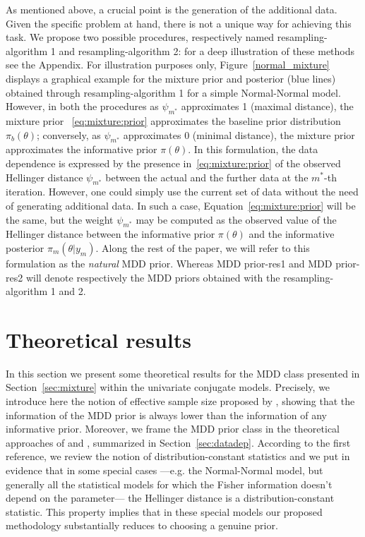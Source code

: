 \documentclass{statsoc}
\begin{document}
As mentioned above, a crucial point is the generation of the additional data. Given the specific problem at hand, there is not a unique way for achieving this task. We propose two possible procedures, respectively named resampling-algorithm 1 and resampling-algorithm 2: for a deep illustration of these methods see the Appendix. For illustration purposes only, Figure~\ref{normal_mixture} displays a graphical example for the mixture prior and posterior (blue lines) obtained through resampling-algorithm 1 for a simple Normal-Normal model. However, in both the procedures as $\psi_{m^{*}}$ approximates 1 (maximal distance), the mixture prior~
\eqref{eq:mixture:prior} approximates the baseline prior 
distribution $\pi_{b}(\theta)$; conversely, as $\psi_{m^{*}}$ 
approximates 0 (minimal distance), the mixture prior approximates the informative prior 
$\pi(\theta)$. In this formulation, the data dependence is expressed
by the presence in~\eqref{eq:mixture:prior} of the observed 
Hellinger distance $\psi_{m^{*}}$ between the actual and the further 
data at the $m^{*}$-th iteration. However, one could simply use the 
current set of data without the need of generating additional data. 
In such a case, Equation~\eqref{eq:mixture:prior} will be the same, 
but the weight $\psi_{m^{*}}$ may be 
computed as the observed value of the Hellinger distance between the 
informative prior $\pi(\theta)$ and the informative posterior 
$\pi_{m}(\theta|y_{m})$. Along the rest of the paper, we will refer to this 
formulation as the \textit{natural} MDD prior. Whereas MDD prior-res1 and MDD prior-res2 will denote respectively the MDD priors obtained with the resampling-algorithm 1 and 2. 




\section{Theoretical results}
\label{sec:theor}


  
In this section we present some theoretical results for the MDD class presented in Section~\ref{sec:mixture} within the univariate conjugate models. Precisely, we introduce here the notion of effective sample size proposed by \cite{morita2008determining}, showing that the information of the MDD prior is always lower than the information of any informative prior. Moreover, we frame the MDD prior class in the theoretical approaches of \cite{darnieder2011bayesian} and \cite{gelmandatadependent}, summarized in Section~\ref{sec:datadep}. According to the first reference, we review the notion of  distribution-constant statistics and we put in evidence that in some special cases ---e.g. the Normal-Normal model, but generally all the statistical models for which the Fisher information doesn't depend on the parameter--- the Hellinger distance is a distribution-constant statistic. This property implies that in these special models our proposed methodology substantially reduces to choosing a genuine prior.
\end{document}
